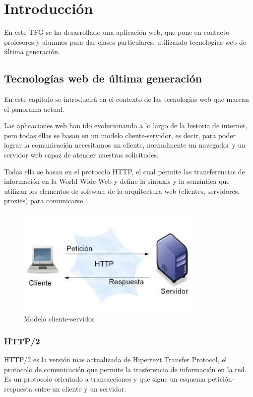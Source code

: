 \chapter{Introducción}
En este TFG se ha desarrollado una aplicación web, que pone en contacto profesores y alumnos para dar clases particulares, utilizando tecnologías web de última generación.

\section{Tecnologías web de última generación}

En este capitulo se introducirá en el contexto de las tecnologías web que marcan el panorama actual.

Las aplicaciones web han ido evolucionando a lo largo de la historia de internet, pero todas ellas se basan en un modelo cliente-servidor, es decir, para poder lograr la comunicación necesitamos un cliente, normalmente un navegador y un servidor web capaz de atender nuestras solicitudes.

Todas ella se basan en el protocolo HTTP, el cual permite las transferencias de información en la World Wide Web y define la sintaxis y la semántica que utilizan los elementos de software de la arquitectura web (clientes, servidores, proxies) para comunicarse.  

\begin{figure}[H]
    \centering
    \includegraphics[width=90mm]{memoria/LaTeX/img/introduccion/cliente-server.jpeg}
    \caption[Modelo cliente-servidor]{Modelo cliente-servidor}
\end{figure}


\subsection*{HTTP/2}
HTTP/2 es la versión mas actualizada de Hipertext Transfer Protocol, el protocolo de comunicación que permite la trasferencia de información en la red. Es un protocolo orientado a transacciones y que sigue un esquema petición-respuesta entre un cliente y un servidor.

